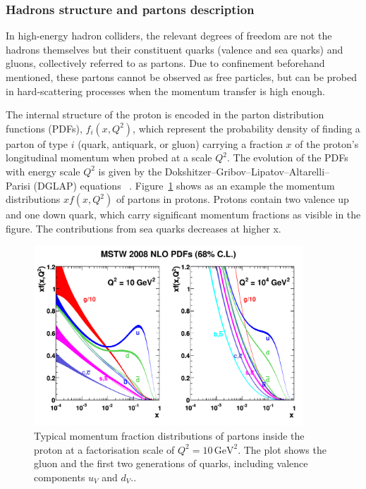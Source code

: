 \documentclass[11pt,twoside]{book}
\begin{document}
\subsubsection*{Hadrons structure and partons description}
\label{subsec:proton}

In high-energy hadron colliders, the relevant degrees of freedom are not the hadrons themselves but their constituent quarks (valence and sea quarks) and gluons, collectively referred to as partons. Due to confinement beforehand mentioned, these partons cannot be observed as free particles, but can be probed in hard-scattering processes when the momentum transfer is high enough.

The internal structure of the proton is encoded in the parton distribution functions (\acrshort{PDF}s), \(f_i(x, Q^2)\), which represent the probability density of finding a parton of type \(i\) (quark, antiquark, or gluon) carrying a fraction \(x\) of the proton's longitudinal momentum when probed at a scale \(Q^2\). The evolution of the \acrshort{PDF}s with energy scale $Q^2$ is given by the Dokshitzer–Gribov–Lipatov–Altarelli–\\Parisi (DGLAP) equations ~\cite{Gribov, ALTARELLI, Dokshitzer}. Figure~\ref{fig:pdfs} shows as an example the momentum distributions $xf(x,Q^2)$ of partons in protons. Protons contain two valence up and one down quark, which carry significant momentum fractions as visible in the figure. The contributions from sea quarks decreases at higher x.
\begin{figure}[htbp]
  \centering
  \includegraphics[width=0.9\textwidth]{images/pdfs.pdf}
  \caption{Typical momentum fraction distributions of partons inside the proton at a factorisation scale of \(Q^2 = 10\,\text{GeV}^2\). The plot shows the gluon and the first two generations of quarks, including valence components \(u_V\) and \(d_V\).\cite{Martin_2009}.}
  \label{fig:pdfs}
\end{figure}
\end{document}
